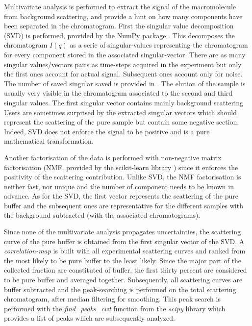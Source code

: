 \documentclass[preprint]{iucr}              %
\begin{document}
Multivariate analysis is performed to extract the signal of the macromolecule from background scattering, and provide a hint on how many components have been separated in the chromatogram. 
First the singular value decomposition (SVD) is performed, provided by the NumPy package \cite{numpy}.
This decomposes the chromatogram $I(q)$ as a serie of singular-values representing the chromatogram for every component stored in the associated singular-vector. 
There are as many singular values/vectors pairs as time-steps acquired in the experiment but only the first ones account for actual signal.
Subsequent ones account only for noise. 
The number of saved singular saved is provided in \cite{svd_threshold}.
The elution of the sample is usually very visible in the chromatogram associated to the second and third singular values.
The first singular vector contains mainly background scattering
Users are sometimes surprised by the extracted singular vectors which should represent the scattering of the pure sample but contain some negative section.
Indeed, SVD does not enforce the signal to be positive and is a pure mathematical transformation.

Another factorisation of the data is performed with non-negative matrix factorisation (NMF, provided by the scikit-learn library \cite{sklearn}) since it enforces the positivity of the scattering contribution. 
Unlike SVD, the NMF factorisation is neither fast, nor unique and the number of component needs to be known in advance.
As for the SVD, the first vector represents the scattering of the pure buffer and the subsequent ones 
are representative for the different samples with the background subtracted (with the associated chromatograms).

Since none of the multivariate analysis propagates uncertainties, the scattering curve of the pure buffer is obtained from the first singular vector of the SVD.
A \textit{correlation-map} is built with all experimental scattering curves and ranked from the  most likely to be pure buffer to the least likely. 
Since the major part of the collected fraction are constituted of buffer, the first thirty percent are considered to be pure buffer and averaged together.
Subsequently, all scattering curves are buffer subtracted %
and the peak-searching is performed on the total scattering chromatogram, after median filtering for smoothing.
This peak search is performed with the \textit{find\_peaks\_cwt} function from the \textit{scipy} library \cite{scipy} which provides a list of peaks which are subsequently analyzed.
\end{document}
